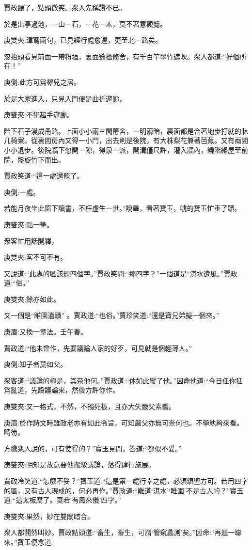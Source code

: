 \begin{parag}
    賈政聽了，點頭微笑。衆人先稱讚不已。
\end{parag}


\begin{parag}
    於是出亭過池，一山一石，一花一木，莫不著意觀覽。\begin{note}庚雙夾:渾寫兩句，已見經行處愈遠，更至北一路矣。\end{note}忽抬頭看見前面一帶粉垣，裏面數楹修舍，有千百竿翠竹遮映。衆人都道:“好個所在！”\begin{note}庚側:此方可爲顰兒之居。\end{note}於是大家進入，只見入門便是曲折遊廊，\begin{note}庚雙夾:不犯超手遊廊。\end{note}階下石子漫成甬路。上面小小兩三間房舍，一明兩暗，裏面都是合著地步打就的牀几椅案。從裏間房內又得一小門，出去則是後院，有大株梨花兼著芭蕉。又有兩間小小退步。後院牆下忽開一隙，得泉一派，開溝僅尺許，灌入牆內，繞階緣屋至前院，盤旋竹下而出。
\end{parag}


\begin{parag}
    賈政笑道:“這一處還罷了。\begin{note}庚側:一處。\end{note}若能月夜坐此窗下讀書，不枉虛生一世。”說畢，看著寶玉，唬的寶玉忙垂了頭。\begin{note}庚雙夾:點一筆。\end{note}衆客忙用話開釋，\begin{note}庚雙夾:客不可不有。\end{note}又說道:“此處的匾該題四個字。”賈政笑問:“那四字？”一個道是“淇水遺風。”賈政道:“俗。”\begin{note}庚雙夾:餘亦如此。\end{note}又一個是“睢園遺蹟” 。賈政道:“也俗。”賈珍笑道:“還是寶兄弟擬一個來。”\begin{note}庚眉:又換一章法。壬午春。\end{note}賈政道:“他未曾作，先要議論人家的好歹，可見就是個輕薄人。”\begin{note}庚側:知子者莫如父。\end{note}衆客道:“議論的極是，其奈他何。”賈政道:“休如此縱了他。”因命他道:“今日任你狂爲亂道，先設議論來，然後方許你作。\begin{note}庚雙夾:又一格式，不然，不獨死板，且亦大失嚴父素體。\end{note}\begin{note}庚眉:於作詩文時雖政老亦有如此令旨，可知嚴父亦無可奈何也。不學紈絝來看。畸笏。\end{note}方纔衆人說的，可有使得的？”寶玉見問，答道:“都似不妥。”\begin{note}庚雙夾:明知是故意要他搬駁議論，落得肆行施展。\end{note}賈政冷笑道:“怎麼不妥？”寶玉道:“這是第一處行幸之處，必須頌聖方可。若用四字的匾，又有古人現成的，何必再作。”賈政道:“難道‘淇水’‘睢園’不是古人的？”寶玉道:“這太板腐了。莫若‘有鳳來儀’四字。”\begin{note}庚雙夾:果然，妙在雙關暗合。\end{note}衆人都鬨然叫妙。賈政點頭道:“畜生，畜生，可謂‘管窺蠡測’矣。”因命:“再題一聯來。”寶玉便念道:
\end{parag}


